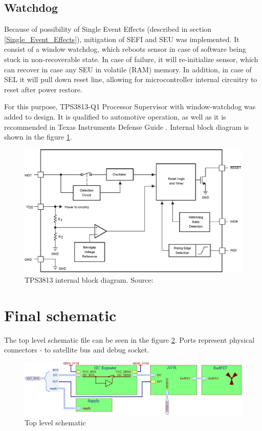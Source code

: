     \subsection{Watchdog}
        Because of possibility of Single Event Effects (described in section \ref{Single_Event_Effects}), mitigation of SEFI and SEU was implemented. It consist of a window watchdog, which reboots sensor in case of software being stuck in non-recoverable state. In case of failure, it will re-initialize sensor, which can recover in case any SEU in volatile (RAM) memory. In addition, in case of SEL it will pull down reset line, allowing for microcontroller internal circuitry to reset after power restore.
        
        For this purpose, TPS3813-Q1 Processor Supervisor with window-watchdog was added to design. It is qualified to automotive operation, as well as it is recommended in Texas Instruments Defense Guide \cite{TI_defense_guide}. Internal block diagram is shown in the figure \ref{TPS3813}.

        \begin{figure}[H]
            \centering
            \includegraphics[width=0.7\paperwidth]{img/06/tps3813.eps}
            \caption{TPS3813 internal block diagram. Source: \cite{TPS3813_datasheet}}
            \label{TPS3813}
        \end{figure}

\newpage
\section{Final schematic}
    The top level schematic file can be seen in the figure \ref{top_level_schematic}. Ports represent physical connectors - to satellite bus and debug socket.

    \begin{figure}[H]
        \centering
        \includegraphics[width=0.8\paperwidth]{img/06/final_schematic_top.eps}
        \caption{Top level schematic}
        \label{top_level_schematic}
    \end{figure}

